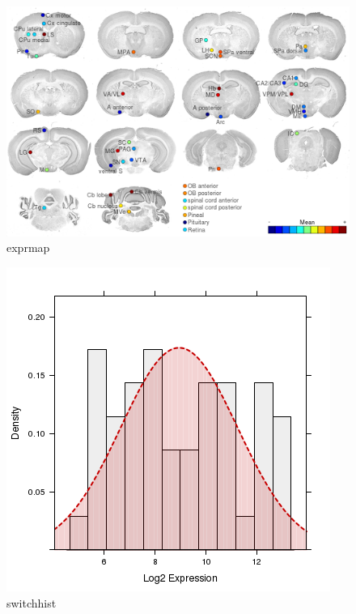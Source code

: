 \documentclass[12pt,fullpage]{article}
\begin{document}
\begin{figure}
  \centering
  \includegraphics{exprmap.png}
  \caption{exprmap}
\end{figure}

\begin{figure}
  \centering
  \includegraphics{switchhist.png}
  \caption{switchhist}
\end{figure}
\end{document}

